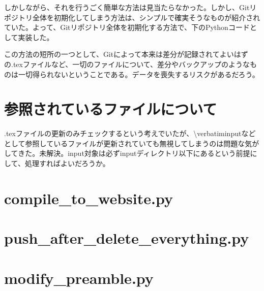 \documentclass[uplatex,dvipdfmx]{jsarticle} \usepackage{amsmath,amssymb,bm}
\begin{document}
しかしながら、それを行うごく簡単な方法は見当たらなかった。しかし、Gitリポジトリ全体を初期化してしまう方法は、シンプルで確実そうなものが紹介されていた。よって、Gitリポジトリ全体を初期化する方法で、下のPythonコードとして実装した。

この方法の短所の一つとして、Gitによって本来は差分が記録されてよいはずの.texファイルなど、一切のファイルについて、差分やバックアップのようなものは一切得られないということである。データを喪失するリスクがあるだろう。



\section*{参照されているファイルについて}
.texファイルの更新のみチェックするという考えでいたが、\textbackslash verbatiminputなどとして参照しているファイルが更新されていても無視してしまうのは問題な気がしてきた。未解決。input対象は必ずinputディレクトリ以下にあるという前提にして、処理すればよいだろうか。



\section*{compile\_to\_website.py}



\section*{push\_after\_delete\_everything.py}



\section*{modify\_preamble.py}




\vspace{\baselineskip}
\begin{paracol}{2}
\switchcolumn
\end{paracol}
\end{document}
